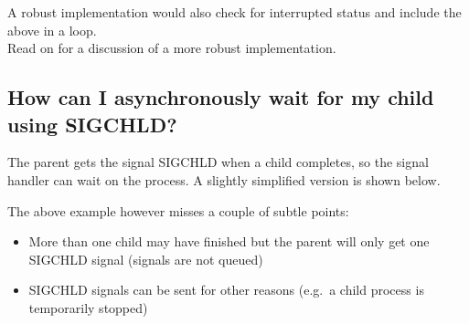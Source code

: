 A robust implementation would also check for interrupted status and
include the above in a loop.\\Read on for a discussion of a more robust
implementation.

\subsection{How can I asynchronously wait for my child using
SIGCHLD?}\label{how-can-i-asynchronously-wait-for-my-child-using-sigchld}

The parent gets the signal SIGCHLD when a child completes, so the signal
handler can wait on the process. A slightly simplified version is shown
below.

\begin{Shaded}
\begin{Highlighting}[]

  
   
  \NormalTok{);}
  \NormalTok{,}\NormalTok{,}\NormalTok{);}
\NormalTok{\}}
 
    

    \NormalTok{) \{ }
   \NormalTok{\} } \NormalTok{\{ }
      \NormalTok{); }
      \NormalTok{);}
   \NormalTok{\}}
    \NormalTok{;}
\NormalTok{\} }
\end{Highlighting}
\end{Shaded}

The above example however misses a couple of subtle points:

\begin{itemize}
\itemsep1pt\parskip0pt
\item
  More than one child may have finished but the parent will only get one
  SIGCHLD signal (signals are not queued)
\item
  SIGCHLD signals can be sent for other reasons (e.g.~a child process is
  temporarily stopped)
\end{itemize}


